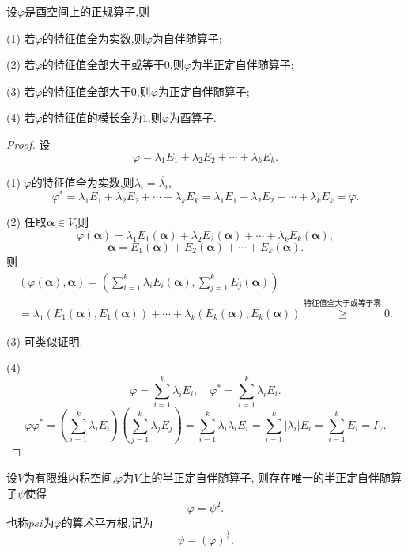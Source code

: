   \begin{theorem}\label{thm:Spectrum3}
    设$\varphi$是酉空间上的正规算子,则

    (1) 若$\varphi$的特征值全为实数,则$\varphi$为自伴随算子;

    (2) 若$\varphi$的特征值全部大于或等于$0$,则$\varphi$为半正定自伴随算子;

    (3) 若$\varphi$的特征值全部大于$0$,则$\varphi$为正定自伴随算子;

    (4) 若$\varphi$的特征值的模长全为$1$,则$\varphi$为酉算子.
  \end{theorem}

  \begin{proof}
    设
    \[
      \varphi=\lambda_1E_1+\lambda_2E_2+\cdots+\lambda_kE_k.
    \]

    (1) $\varphi$的特征值全为实数,则$\lambda_i=\overline{\lambda_i}$,
    \[
      \varphi^*=\overline{\lambda_1}E_1+\overline{\lambda_2}E_2+\cdots+\overline{\lambda_k}E_k
      =\lambda_1E_1+\lambda_2E_2+\cdots+\lambda_kE_k=\varphi.
    \]

    (2) 任取$\bm{\alpha}\in V$,则
  \[
    \varphi(\bm{\alpha})=\lambda_1E_1(\bm{\alpha})+\lambda_2E_2(\bm{\alpha})+\cdots+\lambda_kE_k(\bm{\alpha}),
  \]
  \[
    \bm{\alpha}=E_1(\bm{\alpha})+E_2(\bm{\alpha})+\cdots+E_k(\bm{\alpha}).
  \]
  则
  \begin{align*}
    (\varphi(\bm{\alpha}),\bm{\alpha})=(\sum_{i=1}^k\lambda_iE_i(\bm{\alpha}),
    \sum_{j=1}^kE_j(\bm{\alpha}))\\
    =\lambda_1(E_1(\bm{\alpha}),E_1(\bm{\alpha}))+\cdots+\lambda_k(E_k(\bm{\alpha}),E_k(\bm{\alpha}))
    \overset{\text{特征值全大于或等于零}}{\geq} 0.
  \end{align*}

  (3) 可类似证明.

  (4)
  \[
    \varphi=\sum_{i=1}^k\lambda_iE_i, \quad
    \varphi^*=\sum_{i=1}^k\overline{\lambda_i}E_i.
  \]
  \[
    \varphi\varphi^*=(\sum_{i=1}^k\lambda_iE_i)(\sum_{j=1}^k\overline{\lambda_j}E_j)
    =\sum_{i=1}^k\lambda_i\overline{\lambda_i}E_i=\sum_{i=1}^k|\lambda_i|E_i
    =\sum_{i=1}^kE_i=I_V.
  \]
  \end{proof}

  \begin{theorem}\label{thm:Spectrum4}
    设$V$为有限维内积空间,$\varphi$为$V$上的半正定自伴随算子,
    则存在唯一的半正定自伴随算子$\psi$使得
    \[
      \varphi=\psi^2.
    \]
    也称$psi$为$\varphi$的算术平方根,记为
    \[
      \psi = (\varphi)^{\frac{1}{2}}.
    \]
  \end{theorem}

